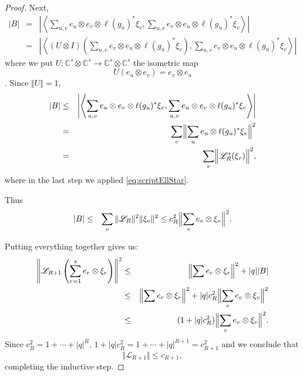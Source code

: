 \documentclass[11pt]{article}
\begin{document}
\begin{proof}
                Next,
    \begin{eqnarray*}
     |B| &=& \left | \left \langle  \sum_{u,v} e_u \otimes e_v \otimes \ell(g_u)^*\xi_v , 
                        \sum_{u,v} e_{v}\otimes e_u \otimes \ell(g_u)^* \xi_v 
                \right \rangle \right | \\
                &=& \left | \left \langle (U\otimes I) (\sum_{u,v} e_v \otimes e_u \otimes \ell(g_u)^*\xi_v ), 
                        \sum_{u,v} e_{v}\otimes e_u \otimes \ell(g_u)^* \xi_v 
                \right \rangle \right | 
    \end{eqnarray*} where we put $U : \mathbb{C}^s \otimes \mathbb{C}^s \to \mathbb{C}^s \otimes \mathbb{C}^s $ the isometric map $$U(e_u\otimes e_v ) = e_v \otimes e_u$$.  Since $\Vert U\Vert=1$,
    \begin{eqnarray*}
     |B| &\leq & \left | \left \langle  \sum_{u,v} e_u \otimes e_v \otimes \ell(g_u)^*\xi_v , 
                        \sum_{u,v} e_{u}\otimes e_v \otimes \ell(g_u)^* \xi_v 
                \right \rangle \right |  \\ 
                &=& \sum_{v} \Bigl\Vert \sum_u e_u\otimes \ell(g_u)^* \xi_v \Bigr\Vert^2
                \\ & = & \sum_v \Bigl \Vert \mathscr{L}_R^* (\xi_v) \Bigr\Vert^2, 
    \end{eqnarray*}
    where in the last step we applied \eqref{eq:scriptEllStar}. 
    
    Thus \begin{eqnarray*}
        |B|&\leq& \sum_v  \Vert \mathscr{L}_R\Vert^2 \Vert \xi_v\Vert^2 
        \leq c_R^2 \Bigl\Vert \sum_{v}  e_v \otimes  \xi_v \Bigr\Vert^2. 
    \end{eqnarray*}

    Putting everything together gives us:
     \begin{eqnarray*}
            \left\Vert \mathscr{L}_{R+1} \left(\sum_{r=1}^s e_r \otimes \xi_r \right) \right \Vert^2 
                &\leq & \Bigl\Vert \sum e_r \otimes \xi_r\Bigr\Vert^2 + |q| |B| \\
                &\leq& \Bigl\Vert \sum e_r \otimes \xi_r\Bigr\Vert^2 + |q| c_R^2 \Bigl\Vert \sum_{v}  e_v \otimes  \xi_v \Bigr\Vert^2 \\ 
                &\leq& (1+|q| c_R^2) \Bigl\Vert \sum_{v}  e_v \otimes  \xi_v \Bigr\Vert^2.
    \end{eqnarray*}
    Since $c_R^2 = 1 + \cdots + |q|^R$, $1+|q|c_R^2 = 1+ \cdots + |q|^{R+1} = c_{R+1}^2$ and we conclude that $$\Vert \mathscr{L}_{R+1}\Vert \leq c_{R+1},$$ completing the inductive step.

    
\end{proof}
\end{document}

